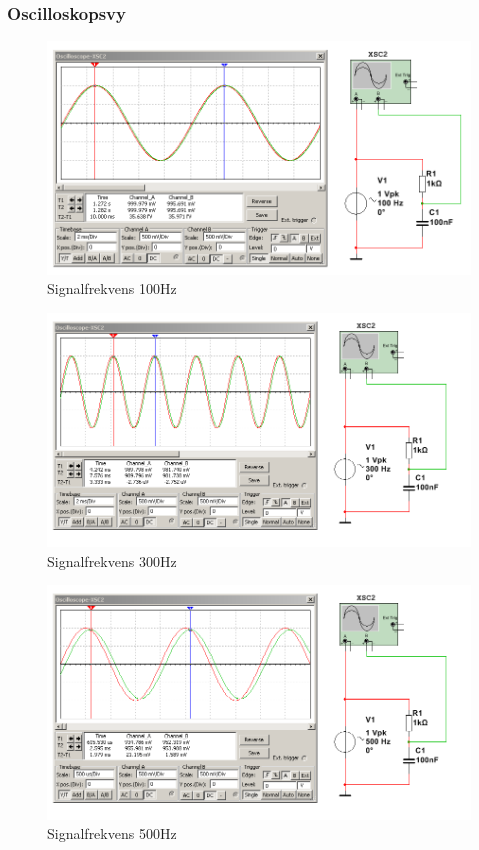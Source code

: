\documentclass[11pt,a4paper]{article}
\begin{document}
\subsubsection{Oscilloskopsvy}
\begin{figure}[htbp]
    \centering
    \includegraphics[scale=0.5]{ee466multisim/5-100Hz.png}
    \caption{Signalfrekvens 100Hz}
    \label{fig:sim-5-100Hz}
\end{figure}

\begin{figure}[htbp]
    \centering
    \includegraphics[scale=0.5]{ee466multisim/5-300Hz.png}
    \caption{Signalfrekvens 300Hz}
    \label{fig:sim-5-300Hz}
\end{figure}

\begin{figure}[htbp]
    \centering
    \includegraphics[scale=0.5]{ee466multisim/5-500Hz.png}
    \caption{Signalfrekvens 500Hz}
    \label{fig:sim-5-500Hz}
\end{figure}
\end{document}
